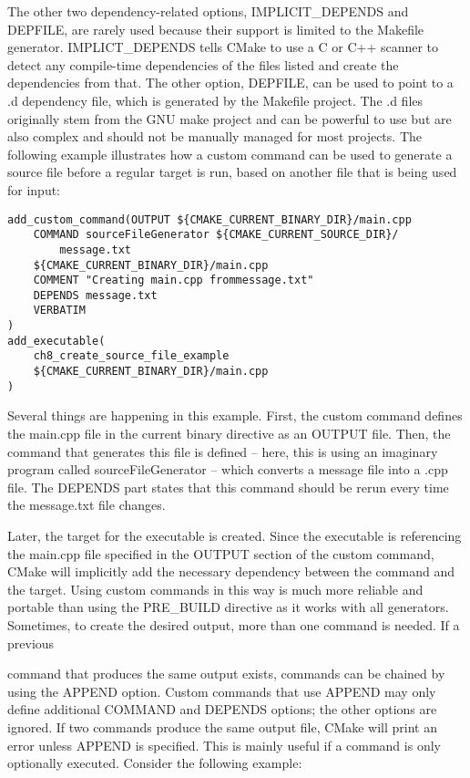 The other two dependency-related options, IMPLICIT\_DEPENDS and DEPFILE, are rarely used because their support is limited to the Makefile generator. IMPLICT\_DEPENDS tells CMake to use a C or C++ scanner to detect any compile-time dependencies of the files listed and create the dependencies from that. The other option, DEPFILE, can be used to point to a .d dependency file, which is generated by the Makefile project. The .d files originally stem from the GNU make project and can be powerful to use but are also complex and should not be manually managed for most projects. The following example illustrates how a custom command can be used to generate a source file before a regular target is run, based on another file that is being used for input:

\begin{lstlisting}[style=styleCMake]
add_custom_command(OUTPUT ${CMAKE_CURRENT_BINARY_DIR}/main.cpp
	COMMAND sourceFileGenerator ${CMAKE_CURRENT_SOURCE_DIR}/
		message.txt
	${CMAKE_CURRENT_BINARY_DIR}/main.cpp
	COMMENT "Creating main.cpp frommessage.txt"
	DEPENDS message.txt
	VERBATIM
)
add_executable(
	ch8_create_source_file_example
	${CMAKE_CURRENT_BINARY_DIR}/main.cpp
)
\end{lstlisting}

Several things are happening in this example. First, the custom command defines the main.cpp file in the current binary directive as an OUTPUT file. Then, the command that generates this file is defined – here, this is using an imaginary program called sourceFileGenerator – which converts a message file into a .cpp file. The DEPENDS part states that this command should be rerun every time the message.txt file changes.

Later, the target for the executable is created. Since the executable is referencing the main.cpp file specified in the OUTPUT section of the custom command, CMake will implicitly add the necessary dependency between the command and the target. Using custom commands in this way is much more reliable and portable than using the PRE\_BUILD directive as it works with all generators. Sometimes, to create the desired output, more than one command is needed. If a previous

command that produces the same output exists, commands can be chained by using the APPEND option. Custom commands that use APPEND may only define additional COMMAND and DEPENDS options; the other options are ignored. If two commands produce the same output file, CMake will print an error unless APPEND is specified. This is mainly useful if a command is only optionally executed. Consider the following example:

